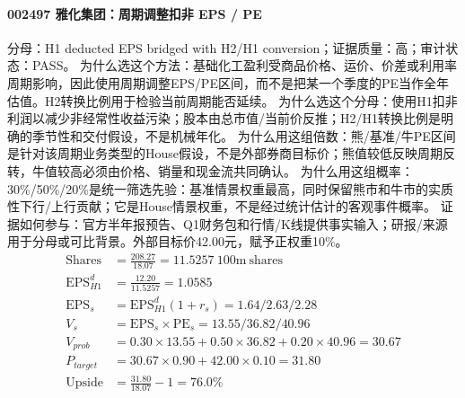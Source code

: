 \paragraph{002497 雅化集团：周期调整扣非 EPS / PE}
分母：H1 deducted EPS bridged with H2/H1 conversion；证据质量：高；审计状态：PASS。
为什么选这个方法：基础化工盈利受商品价格、运价、价差或利用率周期影响，因此使用周期调整EPS/PE区间，而不是把某一个季度的PE当作全年估值。H2转换比例用于检验当前周期能否延续。
为什么选这个分母：使用H1扣非利润以减少非经常性收益污染；股本由总市值/当前价反推；H2/H1转换比例是明确的季节性和交付假设，不是机械年化。
为什么用这组倍数：熊/基准/牛PE区间是针对该周期业务类型的House假设，不是外部券商目标价；熊值较低反映周期反转，牛值较高必须由价格、销量和现金流共同确认。
为什么用这组概率：30\%/50\%/20\%是统一筛选先验：基准情景权重最高，同时保留熊市和牛市的实质性下行/上行贡献；它是House情景权重，不是经过统计估计的客观事件概率。
证据如何参与：官方半年报预告、Q1财务包和行情/K线提供事实输入；研报/来源用于分母或可比背景。外部目标价42.00元，赋予正权重10\%。
\begin{align*}
\mathrm{Shares} &= \frac{208.27}{18.07}=11.5257\ \mathrm{100m\ shares}\\
\mathrm{EPS}_{H1}^d &= \frac{12.20}{11.5257}=1.0585\\
\mathrm{EPS}_s &= \mathrm{EPS}_{H1}^d(1+r_s)=1.64/2.63/2.28\\
V_s &= \mathrm{EPS}_s\times \mathrm{PE}_s=13.55/36.82/40.96\\
V_{prob} &= 0.30\times 13.55+0.50\times 36.82+0.20\times 40.96=30.67\\
P_{target} &= 30.67\times 0.90+42.00\times 0.10=31.80\\
\mathrm{Upside} &= \frac{31.80}{18.07}-1=76.0\%\\
\end{align*}

